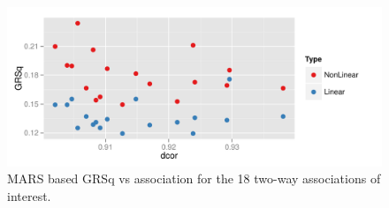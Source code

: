 \documentclass[a4paper, 12pt]{report}
\begin{document}
\begin{figure}[H]
\begin{centering}
\includegraphics[width=\textwidth]{grsqVdcor.pdf}
\caption{MARS based GRSq vs association for the 18 two-way associations of interest.} 
\label{F:GRSqvAssociation}
\end{centering}
\end{figure}


\end{document}
